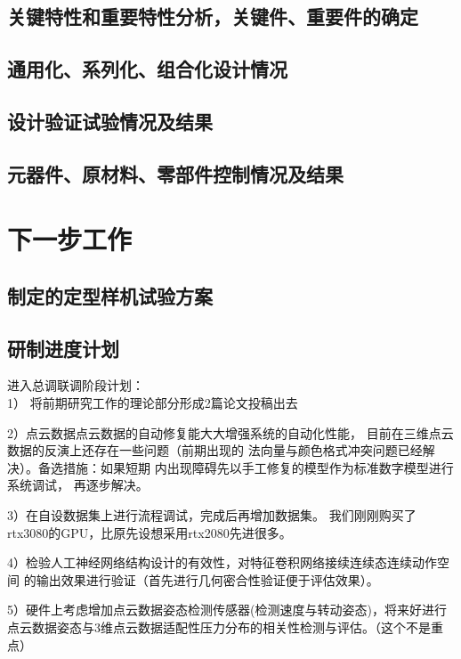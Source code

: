 \documentclass[a4paper,12pt]{ctexbook}	%
\begin{document}
\section{关键特性和重要特性分析，关键件、重要件的确定}

\section{通用化、系列化、组合化设计情况}

\section{设计验证试验情况及结果}

\section{元器件、原材料、零部件控制情况及结果}

\chapter{下一步工作}

\section{制定的定型样机试验方案}

\section{研制进度计划}

进入总调联调阶段计划：\\
1） 将前期研究工作的理论部分形成2篇论文投稿出去

2）点云数据点云数据的自动修复能大大增强系统的自动化性能，
目前在三维点云数据的反演上还存在一些问题（前期出现的
法向量与颜色格式冲突问题已经解决）。备选措施：如果短期
内出现障碍先以手工修复的模型作为标准数字模型进行系统调试，
再逐步解决。

3）在自设数据集上进行流程调试，完成后再增加数据集。
我们刚刚购买了rtx3080的GPU，比原先设想采用rtx2080先进很多。

4）检验人工神经网络结构设计的有效性，对特征卷积网络接续连续态连续动作空间
的输出效果进行验证（首先进行几何密合性验证便于评估效果）。

5）硬件上考虑增加点云数据姿态检测传感器(检测速度与转动姿态)，将来好进行点云数据姿态与3维点云数据适配性压力分布的相关性检测与评估。（这个不是重点）
\end{document}
